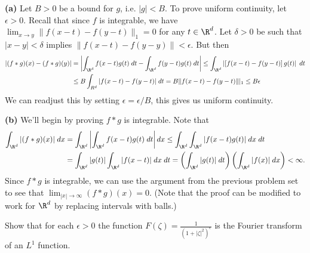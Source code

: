 \documentclass[11pt,letterpaper]{article}
\begin{document}
\begin{solution}
    \textbf{(a)} Let $B>0$ be a bound for $g$, i.e. $|g|<B$. To prove uniform continuity, let $\epsilon > 0$. Recall that since $f$ is integrable, we have $\lim_{x\to y} \| f(x-t) - f(y-t)\|_1 = 0$ for any $t\in \R^d$. Let $\delta > 0$ be such that $|x-y|<\delta$ implies $\| f(x-t)-f(y-y)\| < \epsilon$. But then
    \[
        \begin{aligned}
            |(f*g)(x)-(f*g)(y)| &= \left|\int_{\R^d}f(x-t)g(t)\;dt - \int_{\R^d}f(y-t)g(t)\;dt\right|\leq \int_{\R^d}\left|\left[f(x-t)-f(y-t)\right]g(t)\right|\;dt\\
            &\leq B\int_{R^d}|f(x-t)-f(y-t)|\;dt = B\|f(x-t)-f(y-t)\||_1\leq B\epsilon
        \end{aligned}
    \]
    We can readjust this by setting $\epsilon = \epsilon /B$, this gives us uniform continuity.

    \textbf{(b)} We'll begin by proving $f * g$ is integrable. Note that 
    \[
        \begin{aligned}
            \int_{\R^d} |(f*g)(x)|\;dx &= \int_{\R^d}\left|\int_{\R^d} f(x-t)g(t)\;dt\right|dx \leq \int_{\R^d}\int_{\R^d} |f(x-t)g(t)|\;dx\;dt\\
            &=\int_{\R^d}|g(t)|\int_{\R^d}|f(x-t)|\;dx\;dt = \left(\int_{\R^d}|g(t)|\;dt\right)\left(\int_{\R^d}|f(x)|\;dx\right)<\infty.
        \end{aligned}
    \] 
    Since $f * g$ is integrable, we can use the argument from the previous problem set to see that $\lim_{|x|\to \infty} (f * g)(x) = 0$. (Note that the proof can be modified to work for $\R^d$ by replacing intervals with balls.)
\end{solution}

\begin{cproblem}{25} Show that for each $\epsilon > 0$ the function $F(\zeta)=\frac{1}{(1+|\zeta|^2)^\epsilon}$ is the Fourier transform of an $L^1$ function.
\end{cproblem}
\end{document}
